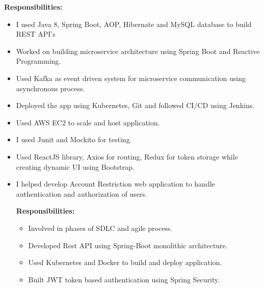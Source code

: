 \documentclass[10pt,a4paper,ragged2e,withhyper]{altacv}
\begin{document}
\begin{paracol}{2}
\begin{itemize}
\textbf{Responsibilities:}
\begin{itemize}
\item I used Java 8, Spring Boot, AOP, Hibernate and MySQL database to build REST API's
\item Worked on building microservice architecture using Spring Boot and Reactive Programming.
\item Used Kafka as event driven system for microservice communication using asynchronous process.
\item Deployed the app using Kubernetes, Git and followed CI/CD using Jenkins.
\item Used AWS EC2 to scale and host application.
\item I used Junit and Mockito for testing. 
\item Used ReactJS library, Axios for routing, Redux for token storage while creating dynamic UI using Bootstrap.
\end{itemize}
\end{itemize}

\divider

\begin{itemize}
\item I helped develop Account Restriction web application to handle authentication and authorization of users.\\
\divider

\textbf{Responsibilities:}
\begin{itemize}
\item Involved in phases of SDLC and agile process.
\item Developed Rest API using Spring-Boot monolithic architecture. 
\item Used Kubernetes and Docker to build and deploy application.
\item Built JWT token based authentication using Spring Security.
\end{itemize}


\end{itemize}


\divider

\divider

\divider

\medskip




\end{paracol}
\end{document}

